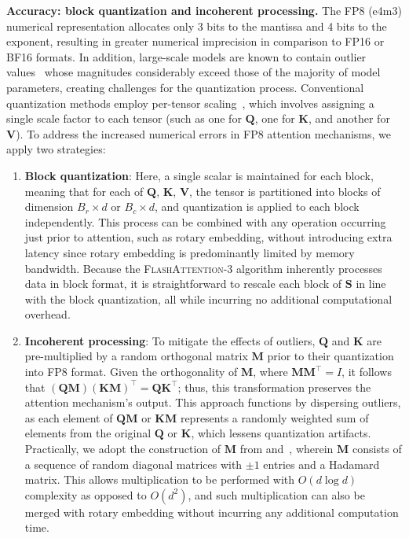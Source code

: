 \begin{enumerate}
\textbf{Accuracy: block quantization and incoherent processing.} The FP8 (e4m3) numerical representation allocates only 3 bits to the mantissa and 4 bits to the exponent, resulting in greater numerical imprecision in comparison to FP16 or BF16 formats. In addition, large-scale models are known to contain outlier values~\citep{dettmers2208llm, sun2024massive} whose magnitudes considerably exceed those of the majority of model parameters, creating challenges for the quantization process. Conventional quantization methods employ per-tensor scaling~\citep{micikevicius2022fp8}, which involves assigning a single scale factor to each tensor (such as one for $\mathbf{Q}$, one for $\mathbf{K}$, and another for $\mathbf{V}$).
To address the increased numerical errors in FP8 attention mechanisms, we apply two strategies:

\begin{enumerate}

\item \textbf{Block quantization}: Here, a single scalar is maintained for each block, meaning that for each of $\mathbf{Q}$, $\mathbf{K}$, $\mathbf{V}$, the tensor is partitioned into blocks of dimension $B_r \times d$ or $B_c \times d$, and quantization is applied to each block independently. This process can be combined with any operation occurring just prior to attention, such as rotary embedding, without introducing extra latency since rotary embedding is predominantly limited by memory bandwidth. Because the \textsc{FlashAttention-3} algorithm inherently processes data in block format, it is straightforward to rescale each block of $\mathbf{S}$ in line with the block quantization, all while incurring no additional computational overhead.
\item \textbf{Incoherent processing}: To mitigate the effects of outliers, $\mathbf{Q}$ and $\mathbf{K}$ are pre-multiplied by a random orthogonal matrix $\mathbf{M}$ prior to their quantization into FP8 format. Given the orthogonality of $\mathbf{M}$, where $\mathbf{M} \mathbf{M}^\top = I$, it follows that $(\mathbf{Q} \mathbf{M}) (\mathbf{K} \mathbf{M})^\top = \mathbf{Q} \mathbf{K}^\top$; thus, this transformation preserves the attention mechanism’s output. This approach functions by dispersing outliers, as each element of $\mathbf{Q} \mathbf{M}$ or $\mathbf{K} \mathbf{M}$ represents a randomly weighted sum of elements from the original $\mathbf{Q}$ or $\mathbf{K}$, which lessens quantization artifacts. Practically, we adopt the construction of $\mathbf{M}$ from \citet{chee2024quip} and~\citet{tseng2024quip}, wherein $\mathbf{M}$ consists of a sequence of random diagonal matrices with $\pm 1$ entries and a Hadamard matrix. This allows multiplication to be performed with $O(d \log d)$ complexity as opposed to $O(d^2)$, and such multiplication can also be merged with rotary embedding without incurring any additional computation time.
\end{enumerate}


\end{enumerate}
